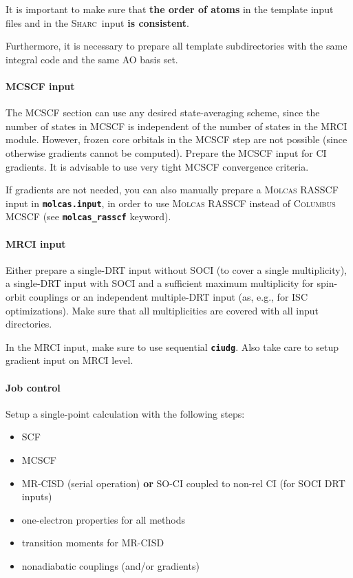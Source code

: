 \documentclass[a4paper,10pt,DIV=15,openany,twoside=false]{scrbook}
\newcommand{\sharc}{\textsc{Sharc}}
\newcommand{\ttt}[1]{\textbf{\texttt{#1}}}
\begin{document}
It is important to make sure that \textbf{the order of atoms} in the template input files and in the \sharc\ input \textbf{is consistent}.

Furthermore, it is necessary to prepare all template subdirectories with the same integral code and the same AO basis set. 

\paragraph{MCSCF input}

The MCSCF section can use any desired state-averaging scheme, since the number of states in MCSCF is independent of the number of states in the MRCI module. However, frozen core orbitals in the MCSCF step are not possible (since otherwise gradients cannot be computed). Prepare the MCSCF input for CI gradients. It is advisable to use very tight MCSCF convergence criteria.

If gradients are not needed, you can also manually prepare a \textsc{Molcas} RASSCF input in \ttt{molcas.input}, in order to use \textsc{Molcas} RASSCF instead of \textsc{Columbus} MCSCF (see \ttt{molcas\_rasscf} keyword).

\paragraph{MRCI input}

Either prepare a single-DRT input without SOCI (to cover a single multiplicity), a single-DRT input with SOCI and a sufficient maximum multiplicity for spin-orbit couplings or an independent multiple-DRT input (as, e.g., for ISC optimizations). Make sure that all multiplicities are covered with all input directories.

In the MRCI input, make sure to use sequential \ttt{ciudg}. Also take care to setup gradient input on MRCI level.

\paragraph{Job control}

Setup a single-point calculation with the following steps:
\begin{itemize}
  \item SCF
  \item MCSCF
  \item MR-CISD (serial operation) \textbf{or} SO-CI coupled to non-rel CI (for SOCI DRT inputs)
  \item one-electron properties for all methods
  \item transition moments for MR-CISD
  \item nonadiabatic couplings (and/or gradients)
\end{itemize}
\end{document}
